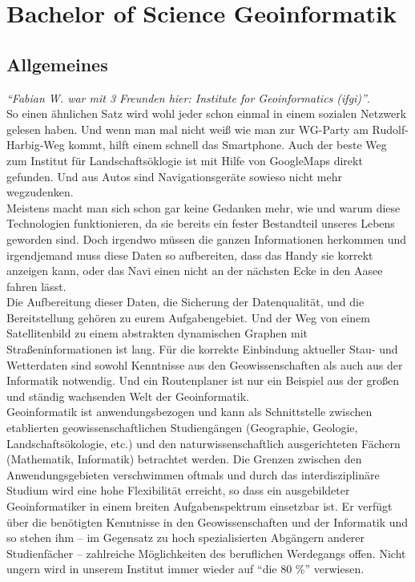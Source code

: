 \chapter{Bachelor of Science Geoinformatik}

\section{Allgemeines}

\emph{"`Fabian W. war mit 3 Freunden hier: Institute for Geoinformatics (ifgi)"'}.\\
So einen ähnlichen Satz wird wohl jeder schon einmal in einem sozialen Netzwerk gelesen haben. Und wenn man mal nicht weiß wie man zur WG-Party am Rudolf-Harbig-Weg kommt, hilft einem schnell das Smartphone. Auch der beste Weg zum Institut für Landschaftsöklogie ist mit Hilfe von GoogleMaps direkt gefunden. Und aus Autos sind Navigationsgeräte sowieso nicht mehr wegzudenken.\\
Meistens macht man sich schon gar keine Gedanken mehr, wie und warum diese Technologien funktionieren, da sie bereits ein fester Bestandteil unseres Lebens geworden sind. Doch irgendwo müssen die ganzen Informationen herkommen und irgendjemand muss diese Daten so aufbereiten, dass das Handy sie korrekt anzeigen kann, oder das Navi einen nicht an der nächsten Ecke in den Aasee fahren lässt.\\
Die Aufbereitung dieser Daten, die Sicherung der Datenqualität, und die Bereitstellung gehören zu eurem Aufgabengebiet. Und der Weg von einem Satellitenbild zu einem abstrakten dynamischen Graphen mit Straßeninformationen ist lang. Für die korrekte Einbindung aktueller Stau- und Wetterdaten sind sowohl Kenntnisse aus den Geowissenschaften als auch aus der Informatik notwendig. Und ein Routenplaner ist nur ein Beispiel aus der großen und ständig wachsenden Welt der Geoinformatik.\\
Geoinformatik ist anwendungsbezogen und kann als Schnittstelle zwischen etablierten geowissenschaftlichen Studiengängen (Geographie, Geologie, Landschaftsökologie, etc.) und den naturwissenschaftlich ausgerichteten Fächern (Mathematik, Informatik) betrachtet werden. Die Grenzen zwischen den Anwendungsgebieten verschwimmen oftmals und durch das interdisziplinäre Studium wird eine hohe Flexibilität erreicht, so dass ein ausgebildeter Geoinformatiker in einem breiten Aufgabenspektrum einsetzbar ist. Er verfügt über die benötigten Kenntnisse in den Geowissenschaften und der Informatik und so stehen ihm -- im Gegensatz zu hoch spezialisierten Abgängern anderer Studienfächer -- zahlreiche Möglichkeiten des beruflichen Werdegangs offen. Nicht ungern wird in unserem Institut immer wieder auf "`die 80 \%"' verwiesen.\\
